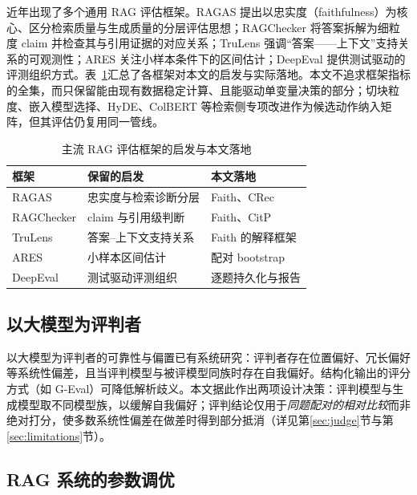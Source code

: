 \documentclass[11pt,a4paper,fontset=fandol]{ctexart}
\begin{document}
近年出现了多个通用 RAG 评估框架。RAGAS\cite{ragas} 提出以忠实度（faithfulness）为核心、区分检索质量与生成质量的分层评估思想；RAGChecker\cite{ragchecker} 将答案拆解为细粒度 claim 并检查其与引用证据的对应关系；TruLens\cite{trulens} 强调``答案——上下文''支持关系的可观测性；ARES\cite{ares} 关注小样本条件下的区间估计；DeepEval\cite{deepeval} 提供测试驱动的评测组织方式。表~\ref{tab:survey}汇总了各框架对本文的启发与实际落地。本文不追求框架指标的全集，而只保留能由现有数据稳定计算、且能驱动单变量决策的部分；切块粒度、嵌入模型选择、HyDE\cite{hyde}、ColBERT\cite{colbert} 等检索侧专项改进作为候选动作纳入矩阵，但其评估仍复用同一管线。

\begin{table}[!htbp]
\centering\footnotesize
\caption{主流 RAG 评估框架的启发与本文落地}\label{tab:survey}
\begin{tabular}{@{}lll@{}}
\toprule
框架 & 保留的启发 & 本文落地 \\
\midrule
RAGAS\cite{ragas} & 忠实度与检索诊断分层 & Faith、CRec \\
RAGChecker\cite{ragchecker} & claim 与引用级判断 & Faith、CitP \\
TruLens\cite{trulens} & 答案--上下文支持关系 & Faith 的解释框架 \\
ARES\cite{ares} & 小样本区间估计 & 配对 bootstrap \\
DeepEval\cite{deepeval} & 测试驱动评测组织 & 逐题持久化与报告 \\
\bottomrule
\end{tabular}
\end{table}

\subsection{以大模型为评判者}

以大模型为评判者的可靠性与偏置已有系统研究：评判者存在位置偏好、冗长偏好等系统性偏差\cite{zheng2023judge,ye2024justice}，且当评判模型与被评模型同族时存在自我偏好\cite{wataoka2024selfpref}。结构化输出的评分方式（如 G-Eval\cite{geval}）可降低解析歧义。本文据此作出两项设计决策：评判模型与生成模型取不同模型族，以缓解自我偏好；评判结论仅用于\emph{同题配对的相对比较}而非绝对打分，使多数系统性偏差在做差时得到部分抵消（详见第\ref{sec:judge}节与第\ref{sec:limitations}节）。

\subsection{RAG 系统的参数调优}
\end{document}
